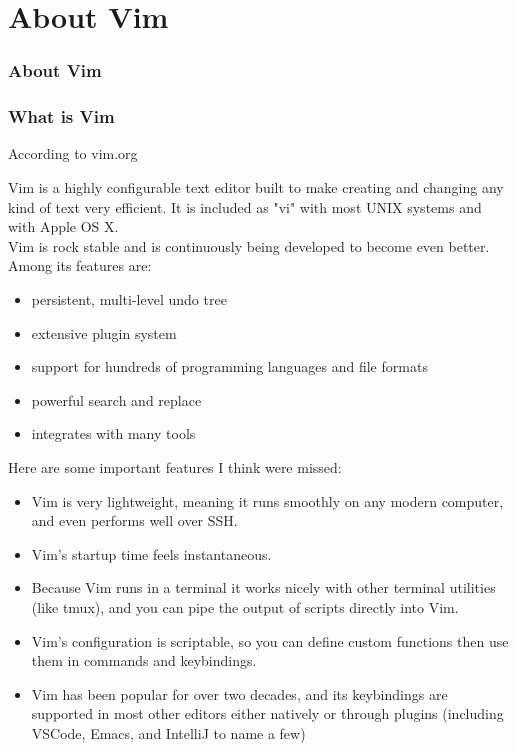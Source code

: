 \documentclass{beamer}
\begin{document}
\section{About Vim}
\begin{frame}
    \frametitle{About Vim}
    \tableofcontents[currentsection]
\end{frame}
\begin{frame}
    \frametitle{What is Vim}
    \centerline{\large According to vim.org}
    \vspace{0.5cm}
    \small Vim is a highly configurable text editor built to make creating and changing any kind of text very efficient. It is included as "vi" with most UNIX systems and with Apple OS X.\\
    \vspace{0.5cm}
    Vim is rock stable and is continuously being developed to become even better. Among its features are:\\
    \begin{itemize}
	\item persistent, multi-level undo tree
	\item extensive plugin system
	\item support for hundreds of programming languages and file formats
	\item powerful search and replace
	\item integrates with many tools
    \end{itemize}
\end{frame}

\begin{frame}
    \centerline{\large Here are some important features I think were missed:}
    \vspace{0.5cm}
    \small
    \begin{itemize}
	\item Vim is very lightweight, meaning it runs smoothly on any modern computer, and even performs well over SSH.
	\item Vim's startup time feels instantaneous.
	\item Because Vim runs in a terminal it works nicely with other terminal utilities (like tmux), and you can pipe the output of scripts directly into Vim.
	\item Vim's configuration is scriptable, so you can define custom functions then use them in commands and keybindings.
	\item Vim has been popular for over two decades, and its keybindings are supported in most other editors either natively or through plugins (including VSCode, Emacs, and IntelliJ to name a few)
    \end{itemize}
\end{frame}
\end{document}
